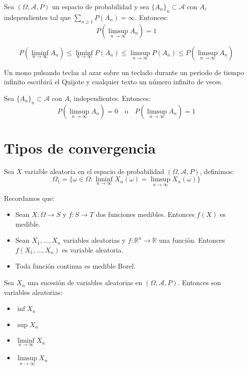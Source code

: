 \begin{theorem}
    Sea $(\Omega, \mathcal{A}, P)$ un espacio de probabilidad y sea $\{A_n\}_n \subset \mathcal{A}$ con $A_i$ independientes tal que $\sum_{n \geq 1} P(A_n) = \infty$.
    Entonces:
    $$P(\limsup\limits_{n \to \infty} A_n) = 1$$
\end{theorem}

\begin{remark}
    $$P(\liminf\limits_{n \to \infty} A_n) \leq \liminf\limits_{n \to \infty} P(A_n) \leq \limsup\limits_{n \to \infty} P(A_n) \leq P(\limsup\limits_{n \to \infty} A_n)$$
\end{remark}

\begin{example}
    Un mono pulsando teclas al azar sobre un teclado durante un periodo de tiempo infinito escribirá el Quijote y cualquier texto un número infinito de veces.
\end{example}

\begin{corollary}
    Sea $\{A_n\}_n \subset \mathcal{A}$ con $A_i$ independientes.
    Entonces:
    $$P(\limsup\limits_{n \to \infty} A_n) = 0 \quad \text{o} \quad P(\limsup\limits_{n \to \infty} A_n) = 1$$
\end{corollary}

\section{Tipos de convergencia}
Sea $X$ variable aleatoria en el espacio de probabilidad $(\Omega, \mathcal{A}, P)$, definimos:
$$\Omega_1 = \{ \omega \in \Omega : \liminf\limits_{n \to \infty} X_n(\omega) = \limsup\limits_{n \to \infty} X_n(\omega) \}$$

Recordamos que:
\begin{itemize}
    \item Sean $X: \Omega \to S$ y $f: S \to T$ dos funciones medibles.
          Entonces $f(X)$ es medible.
    \item Sean $X_1, \dots, X_n$ variables aleatorias y $f: \mathbb{R}^n \to \mathbb{R}$ una función.
          Entonces $f(X_1, \dots, X_n)$ es variable aleatoria.
    \item Toda función continua es medible Borel.
\end{itemize}

\begin{theorem}
    Sea ${X_n}$ una sucesión de variables aleatorias en $(\Omega, \mathcal{A}, P)$.
    Entonces son variables aleatorias:
    \begin{itemize}
        \item $\inf X_n$
        \item $\sup X_n$
        \item $\liminf\limits_{n \to \infty} X_n$
        \item $\limsup\limits_{n \to \infty} X_n$
    \end{itemize}
\end{theorem}

